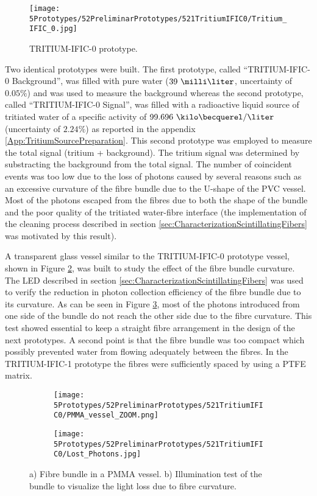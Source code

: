 \begin{figure}[h]
\centering
\texttt{[image: 5Prototypes/52PreliminarPrototypes/521TritiumIFIC0/Tritium\_IFIC\_0.jpg]}
\caption{TRITIUM-IFIC-0 prototype.\label{fig:TritiumIFIC0}}
\end{figure}

Two identical prototypes were built. The first prototype, called ``TRITIUM-IFIC-0 Background'', was filled with pure water ($39~\milli\liter$, uncertainty of $0.05\%$) and was used to measure the background whereas the second prototype, called ``TRITIUM-IFIC-0 Signal'', was filled with a radioactive liquid source of tritiated water of a specific activity of $99.696~\kilo\becquerel/\liter$ (uncertainty of $2.24\%$) as reported in the appendix \ref{App:TritiumSourcePreparation}. This second prototype was employed to measure the total signal (tritium + background). The tritium signal was determined by substracting the background from the total signal. The number of coincident events was too low due to the loss of photons caused by several reasons such as an excessive curvature of the fibre bundle due to the U-shape of the PVC vessel. Most of the photons escaped from the fibres due to both the shape of the bundle and the poor quality of the tritiated water-fibre interface (the implementation of the cleaning process described in section \ref{sec:CharacterizationScintillatingFibers} was motivated by this result). 

A transparent glass vessel similar to the TRITIUM-IFIC-0 prototype vessel, shown in Figure \ref{subfig:PMMAVesselToTestLostPhotons}, was built to study the effect of the fibre bundle curvature. The LED described in section \ref{sec:CharacterizationScintillatingFibers} was used to verify the reduction in photon collection efficiency of the fibre bundle due to its curvature. As can be seen in Figure \ref{subfig:TestLostPhotons}, most of the photons introduced from one side of the bundle do not reach the other side due to the fibre curvature. This test showed essential to keep a straight fibre arrangement in the design of the next prototypes. A second point is that the fibre bundle was too compact which possibly prevented water from flowing adequately between the fibres. In the TRITIUM-IFIC-1 prototype the fibres were sufficiently spaced by using a PTFE matrix.

\begin{figure}
\centering
    \begin{subfigure}[b]{0.45\textwidth}
    \centering
    \texttt{[image: 5Prototypes/52PreliminarPrototypes/521TritiumIFIC0/PMMA\_vessel\_ZOOM.png]}  
    \caption{\label{subfig:PMMAVesselToTestLostPhotons}}
    \end{subfigure}
    \hfill
    \begin{subfigure}[b]{0.45\textwidth}
    \centering
    \texttt{[image: 5Prototypes/52PreliminarPrototypes/521TritiumIFIC0/Lost\_Photons.jpg]}  
    \caption{\label{subfig:TestLostPhotons}}
    \end{subfigure}
 \caption{a) Fibre bundle in a PMMA vessel. b) Illumination test of the bundle to visualize the light loss due to fibre curvature.}
 \label{fig:TestLostPhotons}
\end{figure}

